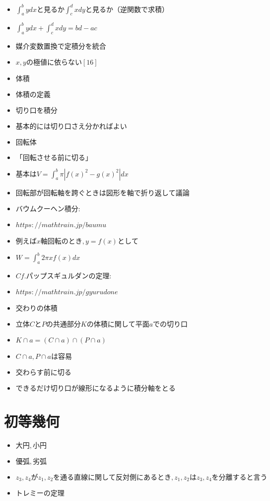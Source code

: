 \documentclass[dvipdfmx,uplatex]{jsarticle}
\begin{document}
\begin{itemize}
		\item $ \int^b_a ydx と見るか \int^d_c xdy と見るか（逆関数で求積）$
			\item $ \int^b_a ydx + \int^d_c xdy = bd - ac$
			\item $ 媒介変数置換で定積分を統合$
				\item $ x,yの極値に依らない [16]$
	\item $ 体積$
		\item $ 体積の定義$
			\item $ 切り口を積分$
			\item $ 基本的には切り口さえ分かればよい$
		\item $ 回転体$
			\item $ 「回転させる前に切る」$
			\item $ 基本はV = \int^b_a \pi |f(x)^2 - g(x)^2|dx$
			\item $ 回転部が回転軸を跨ぐときは図形を軸で折り返して議論$
			\item $ バウムクーヘン積分: $
				\item $ https://mathtrain.jp/baumu$
				\item $ 例えばx軸回転のとき,y = f(x)として$
					\item $ W = \int^b_a 2\pi xf(x)dx$
			\item $ Cf. パップスギュルダンの定理: $
				\item $ https://mathtrain.jp/gyurudone$
		\item $ 交わりの体積$
			\item $ 立体CとPの共通部分Kの体積に関して平面aでの切り口$
			\item $ K \cap a = (C \cap a) \cap (P \cap a)$
				\item $ C \cap a, P \cap a は容易$
			\item $ 交わらす前に切る$
		\item $ できるだけ切り口が線形になるように積分軸をとる$
\end{itemize}

\section{初等幾何}
\begin{itemize}
	\item $ 大円,小円$
	\item $ 優弧,劣弧$
	\item $ z_3,z_4がz_1,z_2を通る直線に関して反対側にあるとき,z_1,z_2はz_3,z_4を分離すると言う$
	\item $ トレミーの定理$
\end{itemize}
\end{document}
